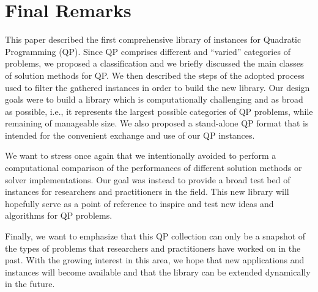 \section{Final Remarks}\label{sec:conclusions}

This paper described the first comprehensive library of instances for Quadratic Programming (QP). Since QP comprises different and ``varied'' categories of problems, we proposed a classification and we briefly discussed the main classes of solution methods for QP.
We then described the steps of the adopted process used to filter the gathered instances  in order to build the new library. Our design goals were to build a library which is computationally challenging and as broad as possible, i.e., it represents the largest possible categories of QP problems, while remaining of manageable size. We also proposed a stand-alone QP format that is intended
for the convenient exchange and use of our QP instances.

We want to stress once again that we intentionally avoided to perform a
computational comparison of the performances of different solution methods or
solver implementations. Our goal was instead to provide a broad test bed of
instances for researchers and practitioners in the field. This new library will
hopefully serve as a point of reference to inspire and test new ideas and
algorithms for QP problems.

Finally, we want to emphasize that this QP collection can only be a snapshot of
the types of problems that researchers and practitioners have worked on in the
past.  With the growing interest in this area, we hope that new applications and
instances will become available and that the library can be extended dynamically
in the future.
